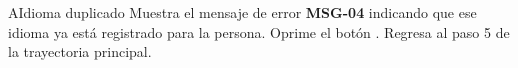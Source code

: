 \begin{UCtrayectoriaA}{A}{Idioma duplicado}
	\UCpaso Muestra el mensaje de error \textbf{MSG-04} indicando que ese idioma ya está registrado para la persona.
	\UCpaso[\UCactor] Oprime el botón .
	\UCpaso Regresa al paso 5 de la trayectoria principal.
\end{UCtrayectoriaA}

